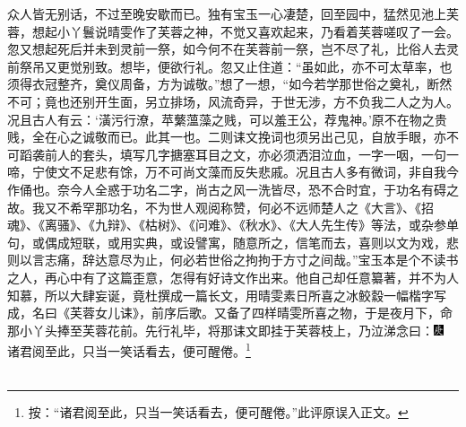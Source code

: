 众人皆无别话，不过至晚安歇而已。独有宝玉一心凄楚，回至园中，猛然见池上芙蓉，想起小丫鬟说晴雯作了芙蓉之神，不觉又喜欢起来，乃看着芙蓉嗟叹了一会。忽又想起死后并未到灵前一祭，如今何不在芙蓉前一祭，岂不尽了礼，比俗人去灵前祭吊又更觉别致。想毕，便欲行礼。忽又止住道：“虽如此，亦不可太草率，也须得衣冠整齐，奠仪周备，方为诚敬。”想了一想，“如今若学那世俗之奠礼，断然不可；竟也还别开生面，另立排场，风流奇异，于世无涉，方不负我二人之为人。况且古人有云：‘潢污行潦，苹蘩薀藻之贱，可以羞王公，荐鬼神。’原不在物之贵贱，全在心之诚敬而已。此其一也。二则诔文挽词也须另出己见，自放手眼，亦不可蹈袭前人的套头，填写几字搪塞耳目之文，亦必须洒泪泣血，一字一咽，一句一啼，宁使文不足悲有馀，万不可尚文藻而反失悲戚。况且古人多有微词，非自我今作俑也。奈今人全惑于功名二字，尚古之风一洗皆尽，恐不合时宜，于功名有碍之故。我又不希罕那功名，不为世人观阅称赞，何必不远师楚人之《大言》、《招魂》、《离骚》、《九辩》、《枯树》、《问难》、《秋水》、《大人先生传》等法，或杂参单句，或偶成短联，或用实典，或设譬寓，随意所之，信笔而去，喜则以文为戏，悲则以言志痛，辞达意尽为止，何必若世俗之拘拘于方寸之间哉。”宝玉本是个不读书之人，再心中有了这篇歪意，怎得有好诗文作出来。他自己却任意纂著，并不为人知慕，所以大肆妄诞，竟杜撰成一篇长文，用晴雯素日所喜之冰鲛縠一幅楷字写成，名曰《芙蓉女儿诔》，前序后歌。又备了四样晴雯所喜之物，于是夜月下，命那小丫头捧至芙蓉花前。先行礼毕，将那诔文即挂于芙蓉枝上，乃泣涕念曰：{\includegraphics[width=3mm]{../Images/00004}  \kaishu 诸君阅至此，只当一笑话看去，便可醒倦。}\footnote{按：“诸君阅至此，只当一笑话看去，便可醒倦。”此评原误入正文。}
\\
\\
\indent
